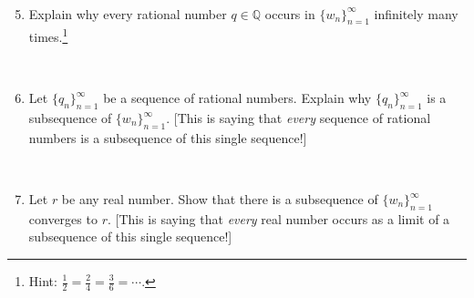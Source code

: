 \documentclass[12pt]{amsart}
\newcommand{\Q}{\mathbb{Q}}
\begin{document}
\

\begin{enumerate}\setcounter{enumi}{4}
\item Explain why every rational number $q\in \Q$ occurs in $\{ w_n\}_{n=1}^\infty$ infinitely many times.\footnote{Hint: $\frac{1}{2} = \frac{2}{4} = \frac{3}{6} = \cdots$.}

\

\item Let $\{q_n\}_{n=1}^\infty$ be a sequence of rational numbers. Explain why $\{ q_n\}_{n=1}^\infty$ is a subsequence of $\{ w_n\}_{n=1}^\infty$. [This is saying that \emph{every} sequence of rational numbers is a subsequence of this single sequence!]

\

\item Let $r$ be any real number. Show that there is a subsequence of $\{ w_n\}_{n=1}^\infty$ converges to $r$. [This is saying that \emph{every} real number occurs as a limit of a subsequence of this single sequence!]

\end{enumerate}
\end{document}
